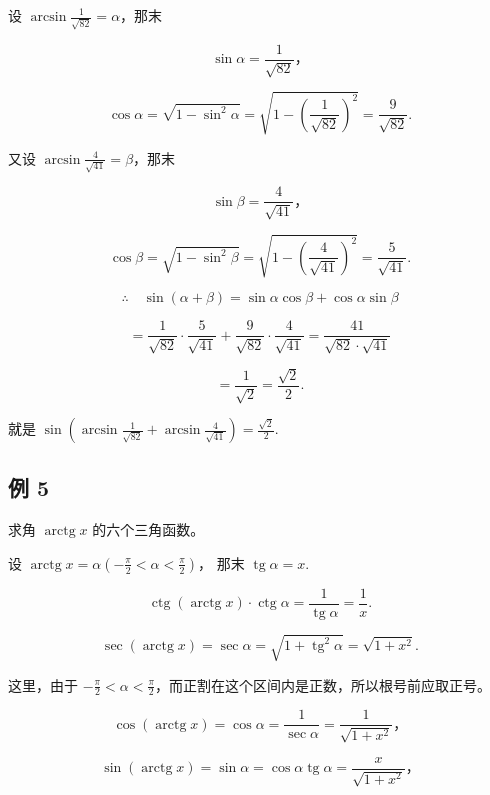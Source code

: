  设 \(\arcsin \frac{1}{\sqrt{82}} = \alpha\)，那末

\[
\sin \alpha = \frac {1}{\sqrt {82}}\text{，}
\]

\[
\cos \alpha = \sqrt {1 - \sin^ {2} \alpha} = \sqrt {1 - \left(\frac {1}{\sqrt {82}}\right) ^ {2}} = \frac {9}{\sqrt {82}}.
\]

又设 \(\arcsin \frac{4}{\sqrt{41}} = \beta\)，那末

\[
\sin \beta = \frac {4}{\sqrt {41}}\text{，}
\]

\[
\cos \beta = \sqrt {1 - \sin^ {2} \beta} = \sqrt {1 - \left(\frac {4}{\sqrt {41}}\right) ^ {2}} = \frac {5}{\sqrt {41}}.
\]

\[
\therefore \quad \sin (\alpha + \beta) = \sin \alpha \cos \beta + \cos \alpha \sin \beta
\]

\[
= \frac {1}{\sqrt {82}} \cdot \frac {5}{\sqrt {41}} + \frac {9}{\sqrt {82}} \cdot \frac {4}{\sqrt {41}} = \frac {41}{\sqrt {82} \cdot \sqrt {41}}
\]

\[
= \frac {1}{\sqrt {2}} = \frac {\sqrt {2}}{2}.
\]

就是
\(\sin (\arcsin \frac{1}{\sqrt{82}} +\arcsin \frac{4}{\sqrt{41}}) = \frac{\sqrt{2}}{2}.\)

\subsection{例 5}

求角 \(\operatorname{arctg} x\) 的六个三角函数。

 设
\(\operatorname{arctg} x = \alpha \left(-\frac{\pi}{2} < \alpha < \frac{\pi}{2}\right)\)，
那末 \(\operatorname{tg} \alpha = x\).

\[
\operatorname{ctg} (\operatorname{arctg} x) \cdot \operatorname{ctg} \alpha = \frac {1}{\operatorname{tg} \alpha} = \frac {1}{x}.
\]

\[
\sec (\operatorname{arctg} x) = \sec \alpha = \sqrt {1 + \operatorname{tg} ^ {2} \alpha} = \sqrt {1 + x ^ {2}}.
\]

这里，由于
\(-\frac{\pi}{2} < \alpha < \frac{\pi}{2}\)，而正割在这个区间内是正数，所以根号前应取正号。

\[
\cos (\operatorname{arctg} x) = \cos \alpha = \frac {1}{\sec \alpha} = \frac {1}{\sqrt {1 + x ^ {2}}}\text{，}
\]

\[
\sin (\operatorname{arctg} x) = \sin \alpha = \cos \alpha \operatorname{tg} \alpha = \frac {x}{\sqrt {1 + x ^ {2}}}\text{，}
\]

